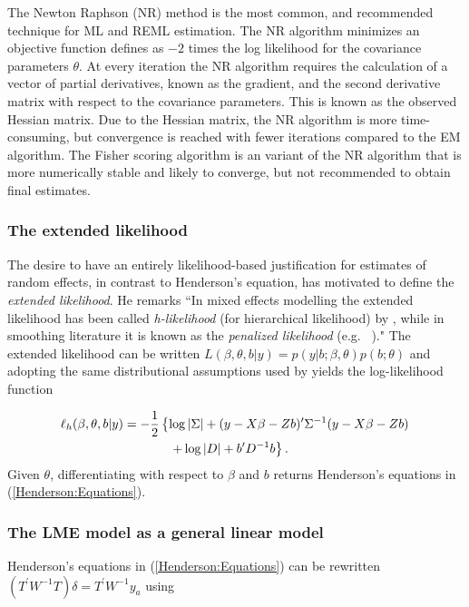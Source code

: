 \documentclass[12pt, a4paper]{report}
\theoremstyle{plain}
\theoremstyle{definition}
\theoremstyle{remark}
\begin{document}
The Newton Raphson (NR) method is the most common, and recommended technique for ML and
REML estimation. The NR algorithm minimizes an objective function defines as $-2$ times the log likelihood for the covariance parameters $\theta$. At every iteration the NR algorithm requires the
calculation of a vector of partial derivatives, known as the gradient, and the second derivative matrix with respect to the covariance parameters. This is known as the observed Hessian matrix. Due to the Hessian matrix, the NR algorithm is more time-consuming, but convergence is reached with fewer iterations compared to the EM algorithm. The Fisher scoring algorithm is an variant of the NR algorithm that is more numerically stable and likely to converge, but not recommended to obtain final estimates.




\subsubsection{The extended likelihood}

The desire to have an entirely likelihood-based justification for estimates of random effects, in contrast to Henderson's equation, has motivated \citet[page 429]{Pawi:in:2001} to define the \emph{extended likelihood}. He remarks ``In mixed effects modelling the extended likelihood has been called \emph{h-likelihood} (for hierarchical  likelihood) by \cite{Lee:Neld:hier:1996}, while in smoothing literature it is known as the \emph{penalized likelihood} (e.g.\ \citeauthor{Gree:Silv:nonp:1994} \citeyear{Gree:Silv:nonp:1994})." The extended likelihood can be written $L(\beta,\theta,b|y) = p(y|b;\beta,\theta) p(b;\theta)$ and adopting the same distributional assumptions used by \cite{Henderson:1950} yields the log-likelihood function

\begin{eqnarray}
	\ell_h(\beta,\theta,b|y)
	& = \displaystyle -\frac{1}{2} \left\{ \log|\Sigma| + (y - X \beta -Zb)'\Sigma^{-1}( y - X \beta -Zb) \right.\\
	&  \hspace{0.5in} \left. + \log|D| + b^\prime D^{-1}b \right\}.
\end{eqnarray}
Given $\theta$, differentiating with respect to $\beta$ and $b$ returns Henderson's equations in (\ref{Henderson:Equations}).

\subsubsection{The LME model as a general linear model}
Henderson's equations in (\ref{Henderson:Equations}) can be rewritten $( T^\prime W^{-1} T ) \delta = T^\prime W^{-1} y_{a} $ using
\end{document}
